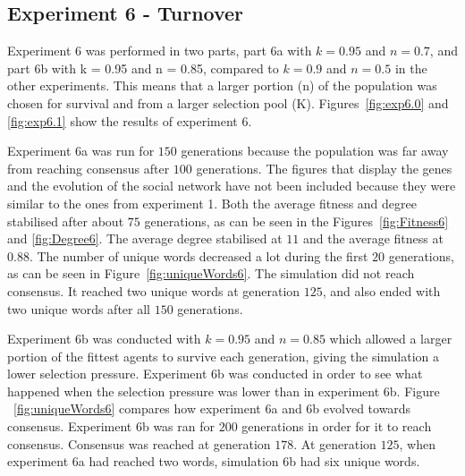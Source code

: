 \clearpage
\subsection{Experiment 6 - Turnover}
%
Experiment 6 was performed in two parts, part 6a with $k = 0.95$ and $n = 0.7$, and part 6b with k = 0.95 and n = 0.85, compared to $k = 0.9$ and $n = 0.5$ in the other experiments. This means that a larger portion (n) of the population was chosen for survival and from a larger selection pool (K). Figures~\ref{fig:exp6.0} and \ref{fig:exp6.1} show the results of experiment 6. 

Experiment 6a was run for $150$ generations because the population was far away from reaching consensus after $100$ generations. The figures that display the genes and the evolution of the social network have not been included because they were similar to the ones from experiment 1. Both the average fitness and degree stabilised after about $75$ generations, as can be seen in the Figures~\ref{fig:Fitness6} and \ref{fig:Degree6}. The average degree stabilised at $11$ and the average fitness at $0.88$. The number of unique words decreased a lot during the first $20$ generations, as can be seen in Figure~\ref{fig:uniqueWords6}. The simulation did not reach consensus. It reached two unique words at generation $125$, and also ended with two unique words after all $150$ generations.   

Experiment 6b was conducted with $k = 0.95$ and $n = 0.85$ which allowed a larger portion of the fittest agents to survive each generation, giving the simulation a lower selection pressure. Experiment 6b was conducted in order to see what happened when the selection pressure was lower than in experiment 6b. Figure ~\ref{fig:uniqueWords6} compares how experiment 6a and 6b evolved towards consensus. Experiment 6b was ran for $200$ generations in order for it to reach consensus. Consensus was reached at generation $178$. At generation $125$, when experiment 6a had reached two words, simulation 6b had six unique words. 

